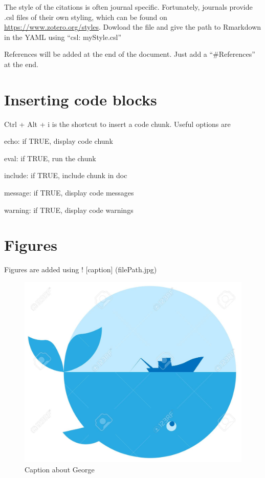 \documentclass[
  11pt,
]{article}
\begin{document}
The style of the citations is often journal specific. Fortunately, journals provide .csl files of their own styling, which can be found on \url{https://www.zotero.org/styles}. Dowload the file and give the path to Rmarkdown in the YAML using ``csl: myStyle.csl''

References will be added at the end of the document. Just add a ``\#References'' at the end.

\hypertarget{inserting-code-blocks}{%
\section{Inserting code blocks}\label{inserting-code-blocks}}

Ctrl + Alt + i is the shortcut to insert a code chunk. Useful options are

echo: if TRUE, display code chunk

eval: if TRUE, run the chunk

include: if TRUE, include chunk in doc

message: if TRUE, display code messages

warning: if TRUE, display code warnings

\hypertarget{figures}{%
\section{Figures}\label{figures}}

Figures are added using ! {[}caption{]} (filePath.jpg)

\begin{figure}
\centering
\includegraphics{George.jpg}
\caption{Caption about George}
\end{figure}
\end{document}
